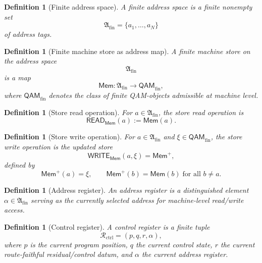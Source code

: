 \documentclass[12pt,a4paper]{article}
\newtheorem{definition}[theorem]{Definition}
\begin{document}
\begin{definition}[Finite address space]\label{def:finite-address-space-computational-layer}
A \emph{finite address space} is a finite nonempty set
\[
\mathfrak{A}_{\mathrm{fin}}=\{a_1,\dots,a_N\}
\]
of address tags.
\end{definition}

\begin{definition}[Finite machine store as address map]\label{def:finite-machine-store-as-address-map-computational-layer}
A \emph{finite machine store} on the address space
\[
\mathfrak{A}_{\mathrm{fin}}
\]
is a map
\[
\mathsf{Mem}:\mathfrak{A}_{\mathrm{fin}}\longrightarrow \mathsf{QAM}_{\mathrm{fin}},
\]
where \(\mathsf{QAM}_{\mathrm{fin}}\) denotes the class of finite QAM-objects admissible at machine level.
\end{definition}

\begin{definition}[Store read operation]\label{def:store-read-operation-computational-layer}
For \(a\in\mathfrak{A}_{\mathrm{fin}}\), the \emph{store read operation} is
\[
\mathsf{READ}_{\mathsf{Mem}}(a):=\mathsf{Mem}(a).
\]
\end{definition}

\begin{definition}[Store write operation]\label{def:store-write-operation-computational-layer}
For \(a\in\mathfrak{A}_{\mathrm{fin}}\) and \(\xi\in\mathsf{QAM}_{\mathrm{fin}}\), the \emph{store write operation} is the updated store
\[
\mathsf{WRITE}_{\mathsf{Mem}}(a,\xi)=\mathsf{Mem}^{+},
\]
defined by
\[
\mathsf{Mem}^{+}(a)=\xi,
\qquad
\mathsf{Mem}^{+}(b)=\mathsf{Mem}(b)
\;\text{for all } b\neq a.
\]
\end{definition}

\begin{definition}[Address register]\label{def:address-register-computational-layer}
An \emph{address register} is a distinguished element \(\alpha\in\mathfrak{A}_{\mathrm{fin}}\) serving as the currently selected address for machine-level read/write access.
\end{definition}

\begin{definition}[Control register]\label{def:control-register-computational-layer}
A \emph{control register} is a finite tuple
\[
\mathcal{R}_{\mathrm{ctrl}}=(p,q,r,\alpha),
\]
where \(p\) is the current program position, \(q\) the current control state, \(r\) the current route-faithful residual/control datum, and \(\alpha\) the current address register.
\end{definition}
\end{document}
